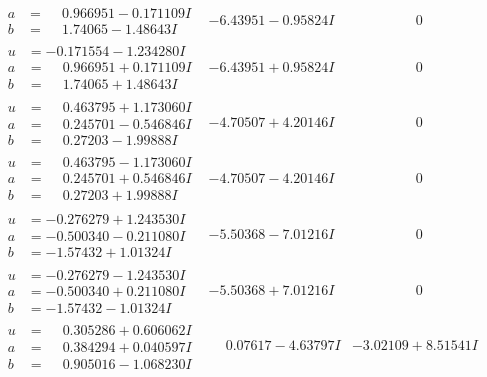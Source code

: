 \documentclass[1p]{elsarticle_modified}
\theoremstyle{definition}
\begin{document}
$$\begin{array}{c|c|c}
\begin{aligned}
a &= \phantom{-}0.966951 - 0.171109 I \\
b &= \phantom{-}1.74065 - 1.48643 I\end{aligned}
 & -6.43951 - 0.95824 I & \phantom{-0.000000 } 0 \\ \hline\begin{aligned}
u &= -0.171554 - 1.234280 I \\
a &= \phantom{-}0.966951 + 0.171109 I \\
b &= \phantom{-}1.74065 + 1.48643 I\end{aligned}
 & -6.43951 + 0.95824 I & \phantom{-0.000000 } 0 \\ \hline\begin{aligned}
u &= \phantom{-}0.463795 + 1.173060 I \\
a &= \phantom{-}0.245701 - 0.546846 I \\
b &= \phantom{-}0.27203 - 1.99888 I\end{aligned}
 & -4.70507 + 4.20146 I & \phantom{-0.000000 } 0 \\ \hline\begin{aligned}
u &= \phantom{-}0.463795 - 1.173060 I \\
a &= \phantom{-}0.245701 + 0.546846 I \\
b &= \phantom{-}0.27203 + 1.99888 I\end{aligned}
 & -4.70507 - 4.20146 I & \phantom{-0.000000 } 0 \\ \hline\begin{aligned}
u &= -0.276279 + 1.243530 I \\
a &= -0.500340 - 0.211080 I \\
b &= -1.57432 + 1.01324 I\end{aligned}
 & -5.50368 - 7.01216 I & \phantom{-0.000000 } 0 \\ \hline\begin{aligned}
u &= -0.276279 - 1.243530 I \\
a &= -0.500340 + 0.211080 I \\
b &= -1.57432 - 1.01324 I\end{aligned}
 & -5.50368 + 7.01216 I & \phantom{-0.000000 } 0 \\ \hline\begin{aligned}
u &= \phantom{-}0.305286 + 0.606062 I \\
a &= \phantom{-}0.384294 + 0.040597 I \\
b &= \phantom{-}0.905016 - 1.068230 I\end{aligned}
 & \phantom{-}0.07617 - 4.63797 I & -3.02109 + 8.51541 I \\ \hline\begin{aligned}

\end{aligned}
\end{array}$$
\end{document}
